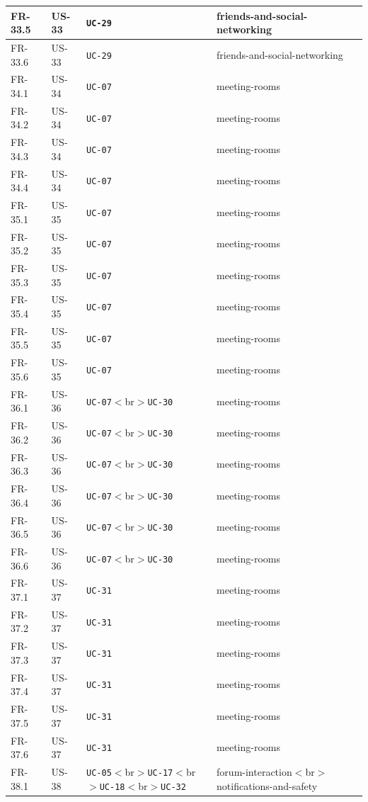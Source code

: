 \documentclass[12pt]{article}
\begin{document}
\begin{longtable}{|>{\raggedright\arraybackslash}p{}|>{\raggedright\arraybackslash}p{}|>{\raggedright\arraybackslash}p{}|>{\raggedright\arraybackslash}p{}|}
FR-33.5 & US-33 & \texttt{UC-29} & friends-and-social-networking \\ \hline
FR-33.6 & US-33 & \texttt{UC-29} & friends-and-social-networking \\ \hline
FR-34.1 & US-34 & \texttt{UC-07} & meeting-rooms \\ \hline
FR-34.2 & US-34 & \texttt{UC-07} & meeting-rooms \\ \hline
FR-34.3 & US-34 & \texttt{UC-07} & meeting-rooms \\ \hline
FR-34.4 & US-34 & \texttt{UC-07} & meeting-rooms \\ \hline
FR-35.1 & US-35 & \texttt{UC-07} & meeting-rooms \\ \hline
FR-35.2 & US-35 & \texttt{UC-07} & meeting-rooms \\ \hline
FR-35.3 & US-35 & \texttt{UC-07} & meeting-rooms \\ \hline
FR-35.4 & US-35 & \texttt{UC-07} & meeting-rooms \\ \hline
FR-35.5 & US-35 & \texttt{UC-07} & meeting-rooms \\ \hline
FR-35.6 & US-35 & \texttt{UC-07} & meeting-rooms \\ \hline
FR-36.1 & US-36 & \texttt{UC-07}$<$br$>$\texttt{UC-30} & meeting-rooms \\ \hline
FR-36.2 & US-36 & \texttt{UC-07}$<$br$>$\texttt{UC-30} & meeting-rooms \\ \hline
FR-36.3 & US-36 & \texttt{UC-07}$<$br$>$\texttt{UC-30} & meeting-rooms \\ \hline
FR-36.4 & US-36 & \texttt{UC-07}$<$br$>$\texttt{UC-30} & meeting-rooms \\ \hline
FR-36.5 & US-36 & \texttt{UC-07}$<$br$>$\texttt{UC-30} & meeting-rooms \\ \hline
FR-36.6 & US-36 & \texttt{UC-07}$<$br$>$\texttt{UC-30} & meeting-rooms \\ \hline
FR-37.1 & US-37 & \texttt{UC-31} & meeting-rooms \\ \hline
FR-37.2 & US-37 & \texttt{UC-31} & meeting-rooms \\ \hline
FR-37.3 & US-37 & \texttt{UC-31} & meeting-rooms \\ \hline
FR-37.4 & US-37 & \texttt{UC-31} & meeting-rooms \\ \hline
FR-37.5 & US-37 & \texttt{UC-31} & meeting-rooms \\ \hline
FR-37.6 & US-37 & \texttt{UC-31} & meeting-rooms \\ \hline
FR-38.1 & US-38 & \texttt{UC-05}$<$br$>$\texttt{UC-17}$<$br$>$\texttt{UC-18}$<$br$>$\texttt{UC-32} & forum-interaction$<$br$>$notifications-and-safety \\ \hline

\end{longtable}
\end{document}
